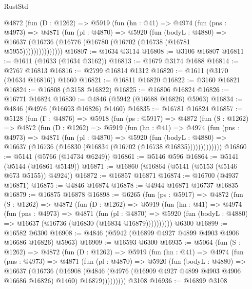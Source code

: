\begin{lexlean}{RustStd}
\begin{coremodule}
          @4872
            (fun (D : @1262) =>
            @5919
              (fun (hn : @41) =>
              @4974
                (fun (pns : @4973) =>
                @4871
                  (fun (pl : @4870) =>
                  @5920
                    (fun (bodyL : @4880) =>
                    @16637 (@16736 (@16776 (@16780 (@16702 (@16738 (@16781 @5955)))))))))))))))
@16807 := @1634 @3114
@16808 := @3106 @16807
@16811 := @1611 (@1633 (@1634 @3162))
@16813 := @1679 @3174 @1688
@16814 := @2767 @16813
@16816 := @2799 @16814 @1312
@16820 := @1611 (@3170 (@1634 @16816)) @1660
@16821 := @16811 @16820
@16822 := @3160 @16821
@16824 := @16808 (@3158 @16822)
@16825 := @16806 @16824
@16826 := @16771 @16824
@16830 := @4846 (@5942 (@16688 @16826) @5963)
@16834 := @4846 (@4976 (@16693 @16826) @1460)
@16835 := @16781 @16824
@16857 := @5128
    (fun (Γ : @4876) =>
    @5918
      (fun (ps : @5917) =>
      @4872
        (fun (S : @1262) =>
        @4872
          (fun (D : @1262) =>
          @5919
            (fun (hn : @41) =>
            @4974
              (fun (pns : @4973) =>
              @4871
                (fun (pl : @4870) =>
                @5920
                  (fun (bodyL : @4880) =>
                  @16637 (@16736 (@16830 (@16834 (@16702 (@16738 @16835)))))))))))))
@16860 := @5141 (@5766 (@14734 @6249))
@16861 := @5146 @596
@16864 := @5141 (@5144 (@16861 @5149))
@16871 := @16860 (@16864 (@5141 (@5153 (@5146 @673 @5155)) @4924))
@16872 := @16857 @16871
@16874 := @16700 (@4937 @16871)
@16875 := @4846 @16874
@16878 := @4944 @16871 @16737 @16835
@16879 := @16875 @16878
@16898 := @6265
    (fun (ps : @5917) =>
    @4872
      (fun (S : @1262) =>
      @4872
        (fun (D : @1262) =>
        @5919
          (fun (hn : @41) =>
          @4974
            (fun (pns : @4973) =>
            @4871
              (fun (pl : @4870) =>
              @5920 (fun (bodyL : @4880) => @16637 (@16736 (@16830 (@16834 @16879))))))))))
    @6300
@16899 := @16582 @6300
@16908 := @4846 (@5942 (@16899 @4927 @4899 @4903 @4906 @16686 @16826) @5963)
@16909 := @16593 @6300
@16935 := @5064
    (fun (S : @1262) =>
    @4872
      (fun (D : @1262) =>
      @5919
        (fun (hn : @41) =>
        @4974
          (fun (pns : @4973) =>
          @4871
            (fun (pl : @4870) =>
            @5920
              (fun (bodyL : @4880) =>
              @16637
                (@16736
                  (@16908
                    (@4846
                      (@4976 (@16909 @4927 @4899 @4903 @4906 @16686 @16826) @1460)
                      @16879)))))))))
    @3108
@16936 := @16899 @3108

\end{coremodule}
\end{lexlean}
